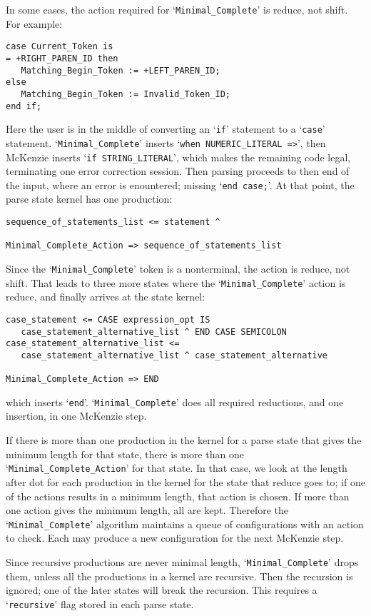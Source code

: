 \documentclass{article}
\newcommand{\code}[1]{`{\tt #1}'}
\begin{document}
In some cases, the action required for \code{Minimal\_Complete} is
reduce, not shift. For example:
\begin{verbatim}
case Current_Token is
= +RIGHT_PAREN_ID then
   Matching_Begin_Token := +LEFT_PAREN_ID;
else
   Matching_Begin_Token := Invalid_Token_ID;
end if;
\end{verbatim}
Here the user is in the middle of converting an \code{if} statement to
a \code{case} statement. \code{Minimal\_Complete} inserts
\code{when NUMERIC\_LITERAL =>}, then McKenzie inserts
\code{if STRING\_LITERAL}, which makes the remaining code legal,
terminating one error correction session. Then parsing proceeds to
then end of the input, where an error is enountered; missing
\code{end case;}. At that point, the parse state kernel has one
production:
\begin{verbatim}
sequence_of_statements_list <= statement ^

Minimal_Complete_Action => sequence_of_statements_list
\end{verbatim}
Since the \code{Minimal\_Complete} token is a nonterminal, the action
is reduce, not shift. That leads to three more states where the
\code{Minimal\_Complete} action is reduce, and finally arrives at the
state kernel:
\begin{verbatim}
case_statement <= CASE expression_opt IS
   case_statement_alternative_list ^ END CASE SEMICOLON
case_statement_alternative_list <=
   case_statement_alternative_list ^ case_statement_alternative

Minimal_Complete_Action => END
\end{verbatim}
which inserts \code{end}. \code{Minimal\_Complete} does all required
reductions, and one insertion, in one McKenzie step.

If there is more than one production in the kernel for a parse state
that gives the minimum length for that state, there is more than one
\code{Minimal\_Complete\_Action} for that state. In that case, we look
at the length after dot for each production in the kernel for the
state that reduce goes to; if one of the actions results in a minimum
length, that action is chosen. If more than one action gives the
minimum length, all are kept. Therefore the \code{Minimal\_Complete}
algorithm maintains a queue of configurations with an action to check.
Each may produce a new configuration for the next McKenzie step.

Since recursive productions are never minimal length,
\code{Minimal\_Complete} drops them, unless all the productions in a
kernel are recursive. Then the recursion is ignored; one of the later
states will break the recursion. This requires a \code{recursive} flag
stored in each parse state.
\end{document}
